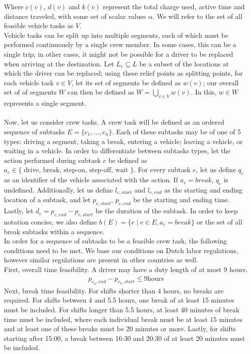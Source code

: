 \documentclass[]{article}
\begin{document}
Where $c(v)$, $d(v)$ and $k(v)$ represent the total charge used, active time and distance traveled, with some set of scalar values $\alpha$. We will refer to the set of all feasible vehicle tasks as $V$. \\
Vehicle tasks can be split up into multiple segments, each of which must be performed continuously by a single crew member. In some cases, this can be a single trip; in other cases, it might not be possible for a driver to be replaced when arriving at the destination. Let $L_r \subseteq L$ be a subset of the locations at which the driver can be replaced; using these relief points as splitting points, for each vehicle task $v \in V$, let its set of segments be defined as $w(v)$; our overall set of of segments $W$ can then be defined as $W = \bigcup_{v \in V}w(v)$. In this, $w \in W$ represents a single segment. \\\\
Now, let us consider crew tasks. A crew task will be defined as an ordered sequence of subtasks $E = \{ e_1, \dots, e_n \}$. Each of these subtasks may be of one of 5 types: driving a segment, taking a break, entering a vehicle; leaving a vehicle, or waiting in a vehicle. In order to differentiate between subtasks types, let the action performed during subtask $e$ be defined as $a_e \in \{\text{ drive, break, step-on, step-off, wait }\}$. For every subtask $e$, let us define $q_e$ as an identifier of the vehicle associated with the action. If $a_e = break$, $q_e$ is undefined. Additionally, let us define $l_{e,start}$ and $l_{e,end}$ as the starting and ending location of a subtask, and let $p_{e,start}$, $p_{e,end}$ be the starting and ending time. Lastly, let $d_e = p_{e,end} - p_{e,start}$ be the duration of the subtask. In order to keep notation concise, we also define $b(E) = \{ e \mid e \in E, a_e = break \}$ or the set of all break subtasks within a sequence.\\
In order for a sequence of subtasks to be a feasible crew task, the following conditions need to be met. We base our conditions on Dutch labor regulations, however similar regulations are present in other countries as well. \\ 
First, overall time feasibility. A driver may have a duty length of at most 9 hours. \\
\begin{align}
  p_{e_n,end} - p_{e_0,start} \leq 9\text{hours}
\end{align}
Next, break time feasibility. For shifts shorter than 4 hours, no breaks are required. For shifts between 4 and 5.5 hours, one break of at least 15 minutes must be included. For shifts longer than 5.5 hours, at least 40 minutes of break time must be included, where each individual break must be at least 15 minutes and at least one of these breaks must be 20 minutes or more. Lastly, for shifts starting after 15:00, a break between 16:30 and 20:30 of at least 20 minutes must be included. 
\end{document}
